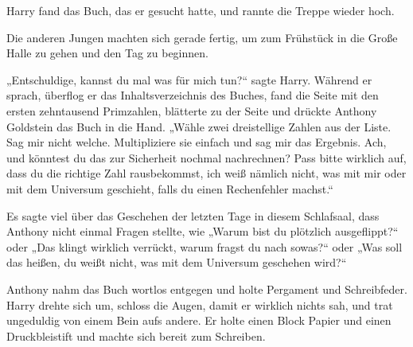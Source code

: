 Harry fand das Buch, das er gesucht hatte, und rannte die Treppe wieder hoch.

Die anderen Jungen machten sich gerade fertig, um zum Frühstück in die Große Halle zu gehen und den Tag zu beginnen.

„Entschuldige, kannst du mal was für mich tun?“ sagte Harry. Während er sprach, überflog er das Inhaltsverzeichnis des Buches, fand die Seite mit den ersten zehntausend Primzahlen, blätterte zu der Seite und drückte Anthony Goldstein das Buch in die Hand.
„Wähle zwei dreistellige Zahlen aus der Liste. Sag mir nicht welche. Multipliziere sie einfach und sag mir das Ergebnis. Ach, und könntest du das zur Sicherheit nochmal nachrechnen? Pass bitte wirklich auf, dass du die richtige Zahl rausbekommst, ich weiß nämlich nicht, was mit mir oder mit dem Universum geschieht, falls du einen Rechenfehler machst.“

Es sagte viel über das Geschehen der letzten Tage in diesem Schlafsaal, dass Anthony nicht einmal Fragen stellte, wie
„Warum bist du plötzlich ausgeflippt?“ oder
„Das klingt wirklich verrückt, warum fragst du nach sowas?“ oder
„Was soll das heißen, du weißt nicht, was mit dem Universum geschehen wird?“

Anthony nahm das Buch wortlos entgegen und holte Pergament und Schreibfeder. Harry drehte sich um, schloss die Augen, damit er wirklich nichts sah, und trat ungeduldig von einem Bein aufs andere. Er holte einen Block Papier und einen Druckbleistift und machte sich bereit zum Schreiben.

